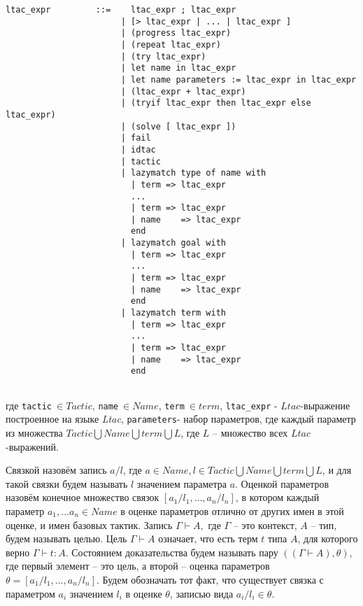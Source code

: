\documentclass[12pt]{article}
\begin{document}
\makeatletter
\def\verbatim@font{\linespread{1}\normalfont\ttfamily}
\makeatother
\begin{verbatim}
ltac_expr         ::=    ltac_expr ; ltac_expr
                       | [> ltac_expr | ... | ltac_expr ]
                       | (progress ltac_expr)
                       | (repeat ltac_expr)
                       | (try ltac_expr)
                       | let name in ltac_expr
                       | let name parameters := ltac_expr in ltac_expr
                       | (ltac_expr + ltac_expr)
                       | (tryif ltac_expr then ltac_expr else ltac_expr)
                       | (solve [ ltac_expr ])
                       | fail
                       | idtac
                       | tactic
                       | lazymatch type of name with 
                         | term => ltac_expr 
                         ...
                         | term => ltac_expr
                         | name    => ltac_expr
                         end
                       | lazymatch goal with 
                         | term => ltac_expr 
                         ...
                         | term => ltac_expr
                         | name    => ltac_expr
                         end
                       | lazymatch term with 
                         | term => ltac_expr 
                         ...
                         | term => ltac_expr
                         | name    => ltac_expr
                         end
                        
\end{verbatim}
где \verb|tactic|$\ \in Tactic$, \verb|name|$\ \in Name$, \verb|term|$\ \in term$, \verb|ltac_expr| - $Ltac$-выражение построенное на языке \textit{Ltac},
\verb|parameters|- набор параметров, где каждый параметр из множества $Tactic \bigcup Name \bigcup term \bigcup L$, где $L$ -- множество всех $Ltac$-выражений.


Связкой назовём запись $a/l$, где $a \in Name, l\in Tactic \bigcup Name \bigcup term \bigcup L$, и для такой связки будем называть $l$ значением параметра $a$.
Оценкой параметров назовём конечное множество связок $[a_1/l_1,...,a_n/l_n]$, в котором каждый параметр $a_1,...a_n \in Name$ в оценке параметров отлично от других имен в этой оценке, и имен базовых тактик.
Запись $\Gamma \vdash A,$ где $\Gamma$ -- это контекст, $A$ -- тип, будем называть целью. Цель $\Gamma \vdash A$ означает, что есть терм $t$ типа $A$, для которого верно $\Gamma \vdash t: A$. 
Состоянием доказательства будем называть пару $((\Gamma \vdash A),\theta)$, где первый элемент -- это цель, а второй -- оценка параметров $\theta = [a_1/l_1, ..., a_n/l_n]$. Будем обозначать тот факт, что существует связка с параметром $a_i$ значением $l_i$ в оценке $\theta$, записью вида $a_i/l_i \in \theta$.
\end{document}
